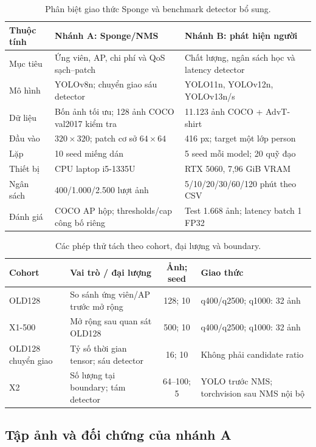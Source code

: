\documentclass[a4paper,fleqn]{cas-dc}
\begin{document}
\begin{table}[t]
\centering
\small
\caption{Phân biệt giao thức Sponge và benchmark detector bổ sung.}
\begin{tabularx}{\textwidth}{@{}X X X @{}}
\toprule
\textbf{Thuộc tính} & \textbf{Nhánh A: Sponge/NMS} & \textbf{Nhánh B: phát hiện người} \\
\midrule
Mục tiêu & Ứng viên, AP, chi phí và QoS sạch--patch & Chất lượng, ngân sách học và latency detector \\
Mô hình & YOLOv8n; chuyển giao sáu detector & YOLO11n, YOLOv12n, YOLOv13n/s \\
Dữ liệu & Bốn ảnh tối ưu; 128 ảnh COCO val2017 kiểm tra & 11.123 ảnh COCO + AdvT-shirt \\
Đầu vào & $320\times320$; patch cơ sở $64\times64$ & 416 px; target một lớp person \\
Lặp & 10 seed miếng dán & 5 seed mỗi model; 20 quỹ đạo \\
Thiết bị & CPU laptop i5-1335U & RTX 5060, 7,96 GiB VRAM \\
Ngân sách & 400/1.000/2.500 lượt ảnh & 5/10/20/30/60/120 phút theo CSV \\
Đánh giá & COCO AP hộp; thresholds/cap công bố riêng & Test 1.668 ảnh; latency batch 1 FP32 \\
\bottomrule
\end{tabularx}
\end{table}
\else
\begin{table}[t]\centering\small
\caption{Các phép thử tách theo cohort, đại lượng và boundary.}
\begin{tabularx}{\textwidth}{@{}l X c X@{}}\toprule
Cohort & Vai trò / đại lượng & Ảnh; seed & Giao thức \\
\midrule
OLD128 & So sánh ứng viên/AP trước mở rộng & 128; 10 & q400/q2500; q1000: 32 ảnh \\
X1-500 & Mở rộng sau quan sát OLD128 & 500; 10 & q400/q2500; q1000: 32 ảnh \\
OLD128 chuyển giao & Tỷ số thời gian tensor; sáu detector & 16; 10 & Không phải candidate ratio \\
X2 & Số lượng tại boundary; tám detector & 64--100; 5 & YOLO trước NMS; torchvision sau NMS nội bộ \\
\bottomrule\end{tabularx}\label{tab:cohorts}\end{table}
\fi

\subsection{Tập ảnh và đối chứng của nhánh A}
\end{document}
